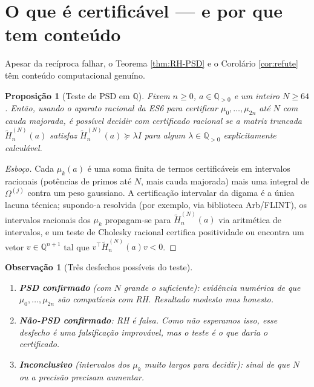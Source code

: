 \documentclass[12pt,a4paper]{article}
\newtheorem{proposicao}{Proposição}
\newtheorem{observacao}{Observação}
\begin{document}
\section{O que é certificável — e por que tem conteúdo}

Apesar da recíproca falhar, o Teorema \ref{thm:RH-PSD} e o Corolário
\ref{cor:refute} têm conteúdo computacional genuíno.

\begin{proposicao}[Teste de PSD em $\mathbb{Q}$]\label{prop:PSD-Q}
Fixem $n\ge 0$, $a\in\mathbb{Q}_{>0}$ e um inteiro $N\ge 64$. Então,
usando o aparato racional da ES6 para certificar $\mu_0,\dots,\mu_{2n}$
até $N$ com cauda majorada, é possível decidir com certificado
racional se a matriz truncada $\widetilde H_n^{(N)}(a)$ satisfaz
$\widetilde H_n^{(N)}(a)\succeq \lambda I$ para algum
$\lambda\in\mathbb{Q}_{>0}$ explicitamente calculável.
\end{proposicao}

\begin{proof}[Esboço]
Cada $\mu_k(a)$ é uma soma finita de termos certificáveis em intervalos
racionais (potências de primos até $N$, mais cauda majorada) mais uma
integral de $\Omega^{(j)}$ contra um peso gaussiano. A certificação
intervalar da digama é a única lacuna técnica; supondo-a resolvida
(por exemplo, via biblioteca Arb/FLINT), os intervalos racionais dos
$\mu_k$ propagam-se para $\widetilde H_n^{(N)}(a)$ via aritmética de
intervalos, e um teste de Cholesky racional certifica positividade ou
encontra um vetor $v\in\mathbb{Q}^{n+1}$ tal que
$v^\top\widetilde H_n^{(N)}(a)v < 0$.
\end{proof}

\begin{observacao}[Três desfechos possíveis do teste]
\begin{enumerate}[label=(\roman*)]
\item \textbf{PSD confirmado} (com $N$ grande o suficiente): evidência
numérica de que $\mu_0,\dots,\mu_{2n}$ são compatíveis com RH. Resultado
modesto mas honesto.
\item \textbf{Não-PSD confirmado}: \emph{RH é falsa}. Como não
esperamos isso, esse desfecho é uma falsificação improvável, mas o teste
é o que daria o certificado.
\item \textbf{Inconclusivo} (intervalos dos $\mu_k$ muito largos para
decidir): sinal de que $N$ ou a precisão precisam aumentar.
\end{enumerate}
\end{observacao}
\end{document}
